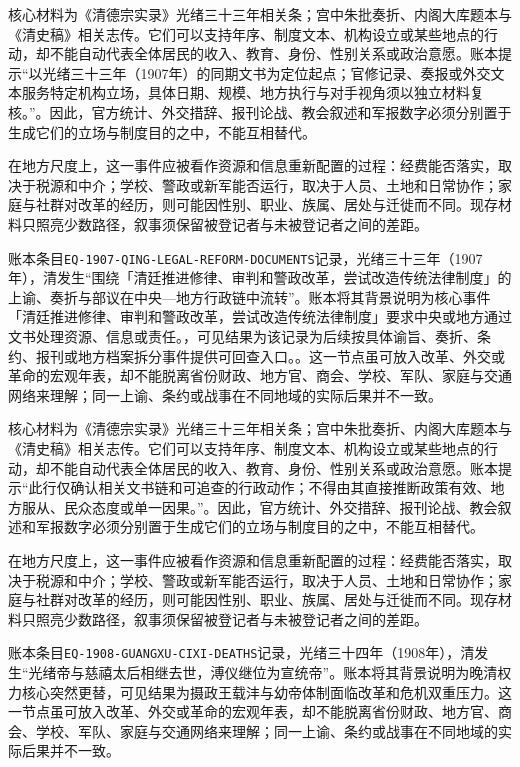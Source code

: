 核心材料为《清德宗实录》光绪三十三年相关条；宫中朱批奏折、内阁大库题本与《清史稿》相关志传。它们可以支持年序、制度文本、机构设立或某些地点的行动，却不能自动代表全体居民的收入、教育、身份、性别关系或政治意愿。账本提示“以光绪三十三年（1907年）的同期文书为定位起点；官修记录、奏报或外交文本服务特定机构立场，具体日期、规模、地方执行与对手视角须以独立材料复核。”。因此，官方统计、外交措辞、报刊论战、教会叙述和军报数字必须分别置于生成它们的立场与制度目的之中，不能互相替代。

在地方尺度上，这一事件应被看作资源和信息重新配置的过程：经费能否落实，取决于税源和中介；学校、警政或新军能否运行，取决于人员、土地和日常协作；家庭与社群对改革的经历，则可能因性别、职业、族属、居处与迁徙而不同。现存材料只照亮少数路径，叙事须保留被登记者与未被登记者之间的差距。

账本条目\texttt{EQ-1907-QING-LEGAL-REFORM-DOCUMENTS}记录，光绪三十三年（1907年），清发生“围绕「清廷推进修律、审判和警政改革，尝试改造传统法律制度」的上谕、奏折与部议在中央—地方行政链中流转”。账本将其背景说明为核心事件「清廷推进修律、审判和警政改革，尝试改造传统法律制度」要求中央或地方通过文书处理资源、信息或责任。，可见结果为该记录为后续按具体谕旨、奏折、条约、报刊或地方档案拆分事件提供可回查入口。。这一节点虽可放入改革、外交或革命的宏观年表，却不能脱离省份财政、地方官、商会、学校、军队、家庭与交通网络来理解；同一上谕、条约或战事在不同地域的实际后果并不一致。

核心材料为《清德宗实录》光绪三十三年相关条；宫中朱批奏折、内阁大库题本与《清史稿》相关志传。它们可以支持年序、制度文本、机构设立或某些地点的行动，却不能自动代表全体居民的收入、教育、身份、性别关系或政治意愿。账本提示“此行仅确认相关文书链和可追查的行政动作；不得由其直接推断政策有效、地方服从、民众态度或单一因果。”。因此，官方统计、外交措辞、报刊论战、教会叙述和军报数字必须分别置于生成它们的立场与制度目的之中，不能互相替代。

在地方尺度上，这一事件应被看作资源和信息重新配置的过程：经费能否落实，取决于税源和中介；学校、警政或新军能否运行，取决于人员、土地和日常协作；家庭与社群对改革的经历，则可能因性别、职业、族属、居处与迁徙而不同。现存材料只照亮少数路径，叙事须保留被登记者与未被登记者之间的差距。

账本条目\texttt{EQ-1908-GUANGXU-CIXI-DEATHS}记录，光绪三十四年（1908年），清发生“光绪帝与慈禧太后相继去世，溥仪继位为宣统帝”。账本将其背景说明为晚清权力核心突然更替，可见结果为摄政王载沣与幼帝体制面临改革和危机双重压力。这一节点虽可放入改革、外交或革命的宏观年表，却不能脱离省份财政、地方官、商会、学校、军队、家庭与交通网络来理解；同一上谕、条约或战事在不同地域的实际后果并不一致。

